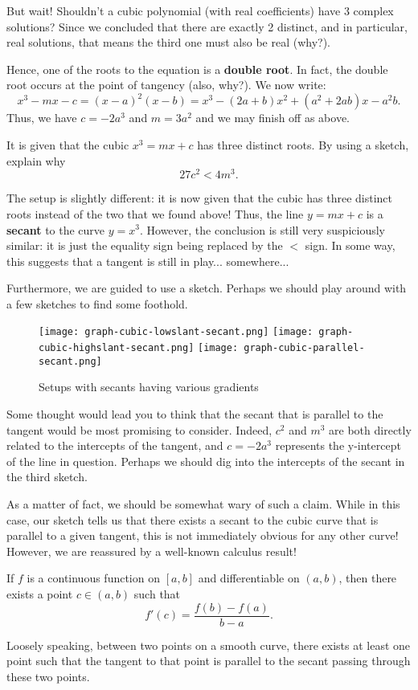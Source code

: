 \documentclass[../jarvis.tex]{subfiles}
\begin{document}
But wait! Shouldn't a cubic polynomial (with real coefficients) have 3 complex solutions? Since we concluded that there are exactly 2 distinct, and in particular, real solutions, that means the third one must also be real (why?).

Hence, one of the roots to the equation is a \textbf{double root}. In fact, the double root occurs at the point of tangency (also, why?). We now write:
$$x^3-mx-c=(x-a)^2(x-b)=x^3-(2a+b)x^2+(a^2+2ab)x-a^2b.$$
Thus, we have $c=-2a^3$ and $m=3a^2$ and we may finish off as above.
\begin{example}[cont.]
It is given that the cubic $x^3=mx+c$ has three distinct roots. By using a sketch, explain why
$$27c^2<4m^3.$$
\end{example}
The setup is slightly different: it is now given that the cubic has three distinct roots instead of the two that we found above! Thus, the line $y=mx+c$ is a \textbf{secant} to the curve $y=x^3$. However, the conclusion is still very suspiciously similar: it is just the equality sign being replaced by the $<$ sign. In some way, this suggests that a tangent is still in play... somewhere...

Furthermore, we are guided to use a sketch. Perhaps we should play around with a few sketches to find some foothold.
\begin{figure}[H]
    \texttt{[image: graph-cubic-lowslant-secant.png]}
    \hfill
    \texttt{[image: graph-cubic-highslant-secant.png]}
    \hfill
    \texttt{[image: graph-cubic-parallel-secant.png]}
    \caption{Setups with secants having various gradients}
\end{figure}
Some thought would lead you to think that the secant that is parallel to the tangent would be most promising to consider. Indeed, $c^2$ and $m^3$ are both directly related to the intercepts of the tangent, and $c=-2a^3$ represents the y-intercept of the line in question. Perhaps we should dig into the intercepts of the secant in the third sketch.

As a matter of fact, we should be somewhat wary of such a claim. While in this case, our sketch tells us that there exists a secant to the cubic curve that is parallel to a given tangent, this is not immediately obvious for any other curve! However, we are reassured by a well-known calculus result!

\begin{theorem}
If $f$ is a continuous function on $[a,b]$ and differentiable on $(a,b)$, then there exists a point $c \in (a,b)$ such that
$$f'(c)=\frac{f(b)-f(a)}{b-a}.$$
\end{theorem}
Loosely speaking, between two points on a smooth curve, there exists at least one point such that the tangent to that point is parallel to the secant passing through these two points.
\end{document}

